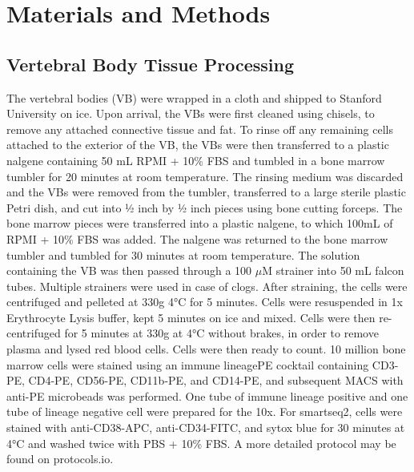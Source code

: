 \section{Materials and Methods}
\subsection{Vertebral Body Tissue Processing}
The vertebral bodies (VB) were wrapped in a cloth and shipped to Stanford University on ice.
Upon arrival, the VBs were first cleaned using chisels, to remove any attached connective tissue
and fat. To rinse off any remaining cells attached to the exterior of the VB, the VBs were then
transferred to a plastic nalgene containing 50 mL RPMI + 10\% FBS and tumbled in a bone marrow
tumbler for 20 minutes at room temperature. The rinsing medium was discarded and the VBs
were removed from the tumbler, transferred to a large sterile plastic Petri dish, and cut into ½ inch
by ½ inch pieces using bone cutting forceps. The bone marrow pieces were transferred into a
plastic nalgene, to which 100mL of RPMI + 10\% FBS was added. The nalgene was returned to
the bone marrow tumbler and tumbled for 30 minutes at room temperature. The solution
containing the VB was then passed through a 100 $\mu$M strainer into 50 mL falcon tubes. Multiple
strainers were used in case of clogs. After straining, the cells were centrifuged and pelleted at
330g 4°C for 5 minutes. Cells were resuspended in 1x Erythrocyte Lysis buffer, kept 5 minutes
on ice and mixed. Cells were then re-centrifuged for 5 minutes at 330g at 4°C without brakes, in
order to remove plasma and lysed red blood cells. Cells were then ready to count. 10 million bone
marrow cells were stained using an immune lineagePE cocktail containing CD3-PE, CD4-PE,
CD56-PE, CD11b-PE, and CD14-PE, and subsequent MACS with anti-PE microbeads was
performed. One tube of immune lineage positive and one tube of lineage negative cell were
prepared for the 10x. For smartseq2, cells were stained with anti-CD38-APC, anti-CD34-FITC,
and sytox blue for 30 minutes at 4°C and washed twice with PBS + 10\% FBS. A more detailed protocol may be found on protocols.io. 